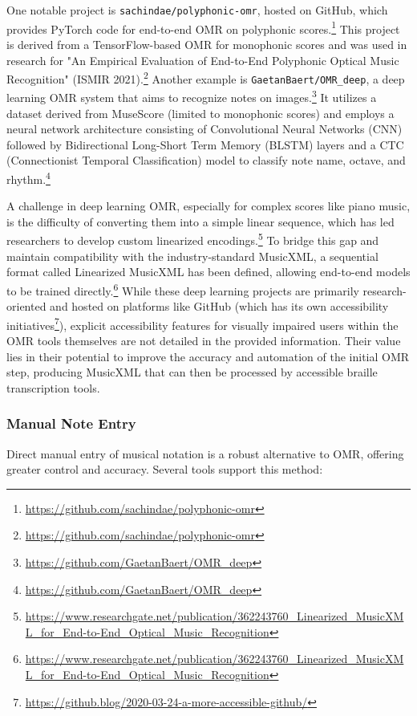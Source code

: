 One notable project is \texttt{sachindae/polyphonic-omr}, hosted on GitHub, which provides PyTorch code for end-to-end OMR on polyphonic scores.\footnote{\url{https://github.com/sachindae/polyphonic-omr}} This project is derived from a TensorFlow-based OMR for monophonic scores and was used in research for "An Empirical Evaluation of End-to-End Polyphonic Optical Music Recognition" (ISMIR 2021).\footnote{\url{https://github.com/sachindae/polyphonic-omr}} Another example is \texttt{GaetanBaert/OMR\_deep}, a deep learning OMR system that aims to recognize notes on images.\footnote{\url{https://github.com/GaetanBaert/OMR_deep}} It utilizes a dataset derived from MuseScore (limited to monophonic scores) and employs a neural network architecture consisting of Convolutional Neural Networks (CNN) followed by Bidirectional Long-Short Term Memory (BLSTM) layers and a CTC (Connectionist Temporal Classification) model to classify note name, octave, and rhythm.\footnote{\url{https://github.com/GaetanBaert/OMR_deep}}

A challenge in deep learning OMR, especially for complex scores like piano music, is the difficulty of converting them into a simple linear sequence, which has led researchers to develop custom linearized encodings.\footnote{\url{https://www.researchgate.net/publication/362243760_Linearized_MusicXML_for_End-to-End_Optical_Music_Recognition}} To bridge this gap and maintain compatibility with the industry-standard MusicXML, a sequential format called Linearized MusicXML has been defined, allowing end-to-end models to be trained directly.\footnote{\url{https://www.researchgate.net/publication/362243760_Linearized_MusicXML_for_End-to-End_Optical_Music_Recognition}} While these deep learning projects are primarily research-oriented and hosted on platforms like GitHub (which has its own accessibility initiatives\footnote{\url{https://github.blog/2020-03-24-a-more-accessible-github/}}), explicit accessibility features for visually impaired users within the OMR tools themselves are not detailed in the provided information. Their value lies in their potential to improve the accuracy and automation of the initial OMR step, producing MusicXML that can then be processed by accessible braille transcription tools.

\subsubsection{Manual Note Entry}
Direct manual entry of musical notation is a robust alternative to OMR, offering greater control and accuracy. Several tools support this method:

